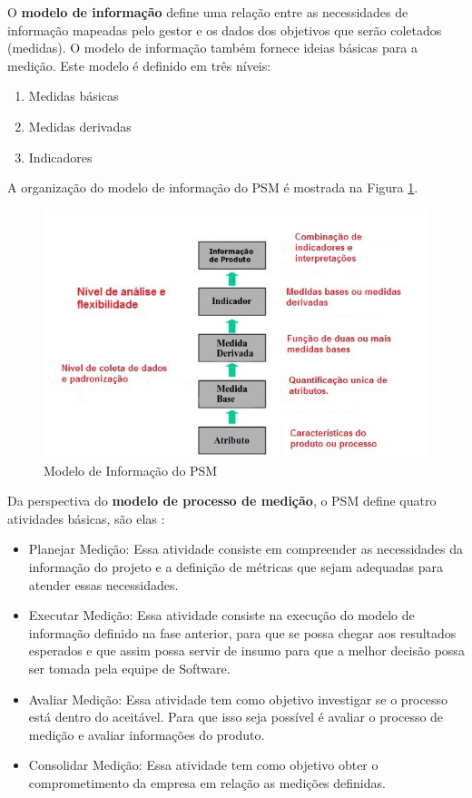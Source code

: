 O \textbf{modelo de informação} define uma relação entre as necessidades de informação mapeadas pelo gestor e os dados dos objetivos que serão coletados (medidas). O modelo de informação também fornece ideias básicas para a medição. Este modelo é definido em três níveis:

\begin{enumerate}
\item Medidas básicas
\item Medidas derivadas
\item Indicadores
\end{enumerate}

A organização do modelo de informação do PSM é mostrada na Figura \ref{Modelo_PSM}.

\begin{figure}[h]
\centering
\includegraphics[keepaspectratio=true,scale=0.8]{figuras/Modelo_Psm.jpg}
\caption{Modelo de Informação do PSM \cite{card_jones} }
\label{Modelo_PSM}
\end{figure}

Da perspectiva do \textbf{modelo de processo de medição}, o PSM define quatro atividades básicas, são elas \cite{card}:

\begin{itemize}
\item Planejar Medição: Essa atividade consiste em compreender as necessidades da informação do projeto e a definição de métricas que sejam adequadas para atender essas necessidades.
\item Executar Medição: Essa atividade consiste na execução do modelo de informação definido na fase anterior, para que se possa chegar aos resultados esperados e que assim possa servir de insumo para que a melhor decisão possa ser tomada pela equipe de Software.
\item Avaliar Medição: Essa atividade tem como objetivo investigar se o processo está dentro do aceitável. Para que isso seja possível é avaliar o processo de medição e avaliar informações do produto.
\item Consolidar Medição:  Essa atividade tem como objetivo obter o comprometimento da empresa em relação as medições definidas.

\end{itemize}

